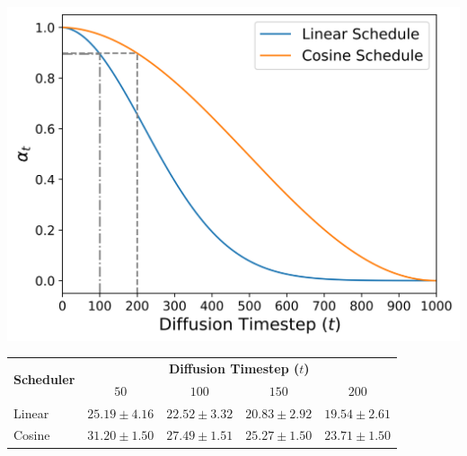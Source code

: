 \documentclass[conference]{IEEEtran}
\theoremstyle{definition}
\theoremstyle{remark}
\theoremstyle{proposition}
\begin{document}
\begin{minipage}{\textwidth}
\vspace{1em}
  \begin{minipage}[tb!]{0.40\textwidth}
    \centering
    \includegraphics[width=1.00\textwidth]{figures/cosine_vs_linear_for_dummies.png}
  \end{minipage}
  \hspace{3em}
  \begin{minipage}[tb!]{0.49\textwidth}
    \centering
    \setlength\tabcolsep{0.45em}
	\def\arraystretch{1.65}
     \begin{center}
    	\begin{footnotesize}
            \begin{tabular}{lcccc}
            \toprule
            \multirow{2}{*}{\textbf{Scheduler}} &\multicolumn{4}{c}{\textbf{Diffusion Timestep ($t$)}}  \\
            \cmidrule{2-5}
                           & $50$               & $100$             & $150$              & $200$    \\
            \midrule
            Linear         & $25.19 \pm 4.16$   & $22.52 \pm 3.32$  & $20.83 \pm 2.92$   & $19.54 \pm 2.61$\\
            Cosine         & $31.20 \pm 1.50$   & $27.49 \pm 1.51$  & $25.27 \pm 1.50$   & $23.71 \pm 1.50$\\
            \bottomrule
            \end{tabular}
	   \end{footnotesize}
    \end{center}
    \end{minipage}
\end{minipage}
\end{document}
